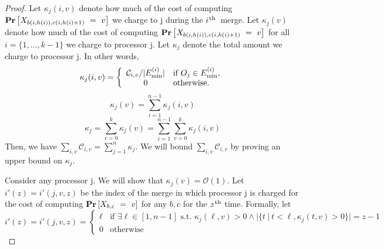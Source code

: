 \documentclass{article}
\newcommand{\ens}[1]{\ensuremath{#1}}					\newcommand{\card}[1]{\ens{|#1|}}							\newcommand{\dotlist}[2]{\ens{#1,\ldots,#2}}
\newcommand{\bigoh}[1]{\ens{\mathcal{O}(#1)}}				\newcommand{\bigom}[1]{\ens{\Omega(#1)}}
\newcommand{\ith}{\ens{i^{\mbox{\hspace{.2mm}\scriptsize th}}}}
\newcommand{\zth}{\ens{z^{ \mbox{\hspace{.2mm}\scriptsize th}}}}
\newcommand{\processor}{processor}
\newcommand{\xitot}{\ens{\mathcal C}}
\newcommand{\mopfirst}[2]{\ens{b{(#1,#2)}}}
\newcommand{\moplast}[2]{\ens{c{(#1,#2)}}}
\newcommand{\picost}[2]{\ens{\xitot_{#1,#2}}}
\newcommand{\minmega}[1]{\ens{E_{\min}^{(#1)}}}
\newcommand{\mindex}[1]{\ens{h(#1)}}
\newcommand{\opchargeind}[3]{\ens{\kappa_{#1}(#2,#3)}}
\newcommand{\opchargev}[2]{\ens{\kappa_{#1}(#2)}}
\newcommand{\opcharge}[1]{\ens{\kappa_{#1}}}
\newcommand{\indexsym}{\ens{i'}}
\newcommand{\chargenumv}[2]{\ens{\indexsym(j,#1,#2)}}
\newcommand{\chargenumvshort}[1]{\ens{\indexsym(#1)}}
\begin{document}
\begin{proof}
Let \opchargeind jiv denote how much of the cost of computing 
$\probeq{\mopfirst i{\mindex i}}{\moplast i{\mindex i + 1}}{v}$ we charge to \op j during the \ith\ merge.
Let \opchargev jv denote how much of the cost of computing 
$\probeq{\mopfirst i{\mindex i}}{\moplast i{\mindex i + 1}}{v}$ for all $i=\{1,\ldots,k-1\}$ we charge to {\processor} \op j.
Let \opcharge j denote the total amount we charge to {\processor} \op j.
In other words, 
\begin{equation}
\label{eq:jiv}
\opchargeind jiv = 
\left\{
\begin{array}{cl}
\picost iv/\card{\minmega i} & \mbox{if } \op j\in\minmega i,  \\
0  &    \mbox{otherwise.}
\end{array}
\right.
\end{equation}
\begin{equation}
\opchargev jv = \sum_{i=1}^{n-1} \opchargeind jiv
\end{equation}
\begin{equation}
\opcharge j = \sum_{v=0}^{k} \opchargev jv = \sum_{i=1}^{n-1}\sum_{v=0}^{k} \opchargeind jiv
\end{equation}
Then, we have $\sum_{i,v} \picost iv = \sum_{j=1}^{n} \opcharge j$.  We will bound $\sum_{i,v}\picost iv$ by proving an upper bound on \opcharge j.


Consider any {\processor} \op j. We will show that $\opchargev jv = \bigoh{1}$. 
Let $\chargenumvshort z = \chargenumv vz$ be the index of the merge in which
{\processor} \op j is charged for the cost of computing $\probeq{b}{c}{v}$ for any $b,c$ for the \zth{}
time. 
Formally, let 
\[
\chargenumvshort z = \chargenumv vz =
\left\{
\begin{array}{cl}
\ell  & \mbox{if } \exists \ell\in[1,n-1] \mbox{ s.t.~} \opchargeind j\ell{v}>0 \wedge \card{\{t\ |\ t<\ell, \opchargeind jtv>0\}} = z-1    \\
0  & \mbox{otherwise}     
\end{array}
\right.
\]



\end{proof}
\end{document}
